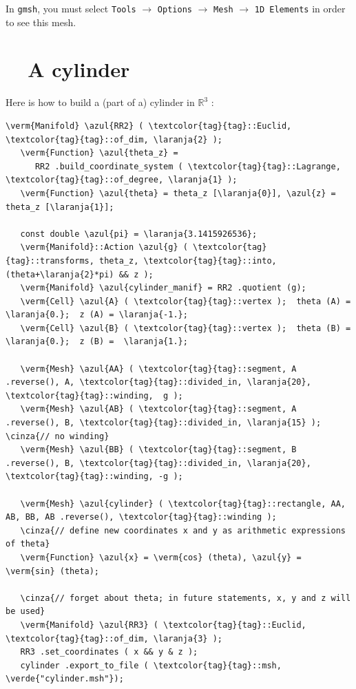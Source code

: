 In {\tt gmsh}, you must select {\small\tt Tools} $\to$ {\small\tt Options} $\to$
{\small\tt Mesh} $\to$ {\small\tt 1D Elements} in order to see this mesh.


\section{~~A cylinder}\label{\numb section 7.\numb parag 3}

Here is how to build a (part of a) cylinder in $ \mathbb{R}^3 $ :

\begin{Verbatim}[commandchars=\\\{\},formatcom=\small\tt,frame=single,
   label=parag-\ref{\numb section 7.\numb parag 3}.cpp,rulecolor=\color{moldura},
   baselinestretch=0.94,framesep=2mm                                            ]
   \verm{Manifold} \azul{RR2} ( \textcolor{tag}{tag}::Euclid, \textcolor{tag}{tag}::of_dim, \laranja{2} );
   \verm{Function} \azul{theta_z} =
      RR2 .build_coordinate_system ( \textcolor{tag}{tag}::Lagrange, \textcolor{tag}{tag}::of_degree, \laranja{1} );
   \verm{Function} \azul{theta} = theta_z [\laranja{0}], \azul{z} = theta_z [\laranja{1}];

   const double \azul{pi} = \laranja{3.1415926536};
   \verm{Manifold}::Action \azul{g} ( \textcolor{tag}{tag}::transforms, theta_z, \textcolor{tag}{tag}::into, (theta+\laranja{2}*pi) && z );
   \verm{Manifold} \azul{cylinder_manif} = RR2 .quotient (g);
   \verm{Cell} \azul{A} ( \textcolor{tag}{tag}::vertex );  theta (A) = \laranja{0.};  z (A) = \laranja{-1.};
   \verm{Cell} \azul{B} ( \textcolor{tag}{tag}::vertex );  theta (B) = \laranja{0.};  z (B) =  \laranja{1.};

   \verm{Mesh} \azul{AA} ( \textcolor{tag}{tag}::segment, A .reverse(), A, \textcolor{tag}{tag}::divided_in, \laranja{20}, \textcolor{tag}{tag}::winding,  g );
   \verm{Mesh} \azul{AB} ( \textcolor{tag}{tag}::segment, A .reverse(), B, \textcolor{tag}{tag}::divided_in, \laranja{15} );  \cinza{// no winding}
   \verm{Mesh} \azul{BB} ( \textcolor{tag}{tag}::segment, B .reverse(), B, \textcolor{tag}{tag}::divided_in, \laranja{20}, \textcolor{tag}{tag}::winding, -g );

   \verm{Mesh} \azul{cylinder} ( \textcolor{tag}{tag}::rectangle, AA, AB, BB, AB .reverse(), \textcolor{tag}{tag}::winding );
   \cinza{// define new coordinates x and y as arithmetic expressions of theta}
   \verm{Function} \azul{x} = \verm{cos} (theta), \azul{y} = \verm{sin} (theta);

   \cinza{// forget about theta; in future statements, x, y and z will be used}
   \verm{Manifold} \azul{RR3} ( \textcolor{tag}{tag}::Euclid, \textcolor{tag}{tag}::of_dim, \laranja{3} );
   RR3 .set_coordinates ( x && y & z );
   cylinder .export_to_file ( \textcolor{tag}{tag}::msh, \verde{"cylinder.msh"});
\end{Verbatim}

